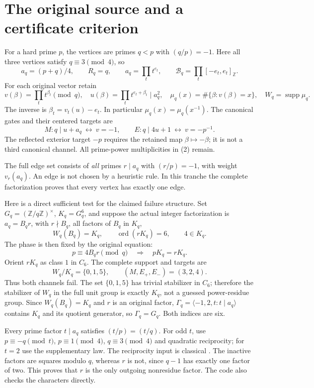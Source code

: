\section{The original source and a certificate criterion}
For a hard prime $p$, the vertices are primes $q<p$ with $(q/p)=-1$.
Here all three vertices satisfy $q\equiv3\pmod4$, so
\[
 a_q=(p+q)/4,\qquad R_q=q,\qquad
 a_q=\prod_t t^{e_t},\qquad
 \mathcal B_q=\prod_t[-e_t,e_t]_{\mathbb Z}.                 \tag{2}
\]
For each original vector retain
\[
 v(\beta)=\prod_t t^{\beta_t}\pmod q,\quad
 u(\beta)=\prod_t t^{e_t+\beta_t}\mid a_q^2,\quad
 \mu_q(x)=\#\{\beta:v(\beta)=x\},\quad W_q=\operatorname{supp}\mu_q. \tag{3}
\]
The inverse is $\beta_t=v_t(u)-e_t$. In particular $\mu_q(x)=\mu_q(x^{-1})$.
The canonical gates and their centered targets are
\[
 M:q\mid u+a_q\ \longleftrightarrow\ v=-1,\qquad
 E:q\mid4u+1\ \longleftrightarrow\ v=-p^{-1}.              \tag{4}
\]
The reflected exterior target $-p$ requires the retained map $\beta\mapsto-\beta$;
it is not a third canonical channel. All prime-power multiplicities in (2) remain.

The full edge set consists of \emph{all} primes $r\mid a_q$ with $(r/p)=-1$, with
weight $v_r(a_q)$. An edge is not chosen by a heuristic rule. In this tranche the
complete factorization proves that every vertex has exactly one edge.

Here is a direct sufficient test for the claimed failure structure. Set
$G_q=(\mathbb Z/q\mathbb Z)^\times$, $K_q=G_q^6$, and suppose the actual integer
factorization is $a_q=B_qr$, with $r\nmid B_q$, all factors of $B_q$ in $K_q$,
\[
 W_q(B_q)=K_q,\qquad \operatorname{ord}(rK_q)=6,\qquad4\in K_q. \tag{5}
\]
The phase is then fixed by the original equation:
\[
 p\equiv4B_qr\pmod q\quad\Longrightarrow\quad pK_q=rK_q.
\]
Orient $rK_q$ as class $1$ in $C_6$. The complete support and targets are
\[
 W_q/K_q=\{0,1,5\},\qquad
 (M,E_+,E_-)=(3,2,4).                                    \tag{6}
\]
Thus both channels fail. The set $\{0,1,5\}$ has trivial stabilizer in $C_6$;
therefore the stabilizer of $W_q$ in the full unit group is exactly $K_q$, not a
guessed power-residue group. Since $W_q(B_q)=K_q$ and $r$ is an original factor,
$\Gamma_q=\langle-1,2,t:t\mid a_q\rangle$ contains $K_q$ and its quotient generator,
so $\Gamma_q=G_q$. Both indices are six.

Every prime factor $t\mid a_q$ satisfies $(t/p)=(t/q)$. For odd $t$, use
$p\equiv-q\pmod t$, $p\equiv1\pmod4$, $q\equiv3\pmod4$ and quadratic reciprocity;
for $t=2$ use the supplementary law. The reciprocity input is classical
\cite[\S6.4]{Hatcher}. The inactive factors are squares modulo $q$, whereas $r$
is not, since $q-1$ has exactly one factor of two. This proves that $r$ is the
only outgoing nonresidue factor. The code also checks the characters directly.

